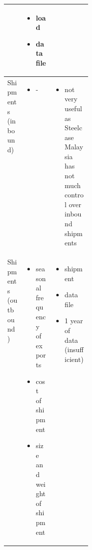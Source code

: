 \documentclass[a4paper, fleqn]{article}
\begin{document}
\begin{center}
\begin{tabular}{| p{0.2\linewidth} | p{} | p{} |}
\begin{itemize}
\end{itemize}  & \begin{itemize}
\item load
\item data file
\end{itemize}\\
\hline
Shipments (inbound) & \begin{itemize}
\item -
\end{itemize}  & \begin{itemize}
\item not very useful as Steelcase Malaysia has not much control over inbound shipments
\end{itemize}\\
\hline
Shipments (outbound) & \begin{itemize}
\item seasonal frequency of exports
\item cost of shipment
\item size and weight of shipment
\end{itemize}  & \begin{itemize}
\item shipment
\item data file
\item 1 year of data (insufficient)
\end{itemize}\\
\hline
\end{tabular}
\end{center}
\end{document}

